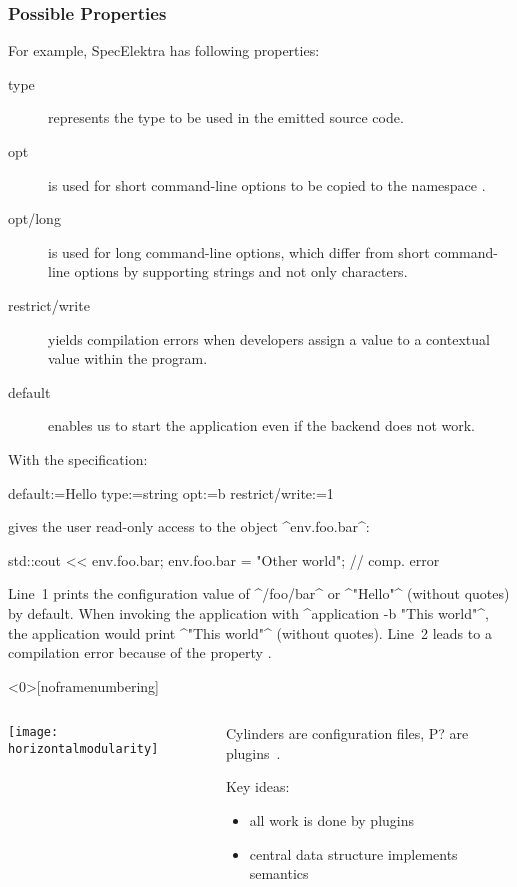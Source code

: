 \begin{frame}
	\frametitle{Possible Properties}
	For example, SpecElektra has following properties:
	\begin{description}
	\item[type] represents the type to be used in the emitted source code.
	\item[opt] is used for short command-line options to be copied to the namespace .
	\item[opt/long] is used for long command-line options, which differ from short command-line options by supporting strings and not only characters.
	\item[restrict/write] yields compilation errors when developers assign a value to a contextual value within the program.
	\item[default] enables us to start the application even if the backend does not work.
	\end{description}
\end{frame}

\begin{frame}[fragile]
	With the specification:
	\par
	\begin{code}
	  default:=Hello
	  type:=string
	  opt:=b
	  restrict/write:=1
	\end{code}
	\par
	 gives the user read-only access to the object ^env.foo.bar^:
	\par
	\begin{code}[language=Cpp]
	std::cout << env.foo.bar;
	env.foo.bar = "Other world"; // comp. error
	\end{code}
	\par
	\small
	\pause
	Line~1 prints the configuration value of ^/foo/bar^ or ^"Hello"^ (without quotes) by default.
	When invoking the application with ^application -b "This world"^, the application would print ^"This world"^ (without quotes).
	Line~2 leads to a compilation error because of the property .
\end{frame}



\begin{frame}<0>[noframenumbering]
	\begin{columns}[c]
	\begin{column}{7cm}
	\texttt{[image: horizontalmodularity]}
	\end{column}
	\begin{column}{4cm}
	Cylinders are configuration files, P? are plugins~\cite{raab2016improving}.

	Key ideas:
	\begin{itemize}
	\item all work is done by plugins
	\item central data structure implements semantics
	\end{itemize}
	\end{column}
	\end{columns}
\end{frame}

